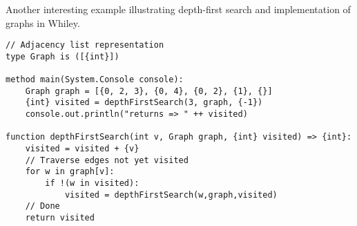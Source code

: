 Another interesting example illustrating depth-first search and implementation of graphs in Whiley.

\begin{lstlisting}
// Adjacency list representation
type Graph is ([{int}])

method main(System.Console console):
    Graph graph = [{0, 2, 3}, {0, 4}, {0, 2}, {1}, {}]
    {int} visited = depthFirstSearch(3, graph, {-1})
    console.out.println("returns => " ++ visited)

function depthFirstSearch(int v, Graph graph, {int} visited) => {int}:
    visited = visited + {v}
    // Traverse edges not yet visited
    for w in graph[v]:
        if !(w in visited):
            visited = depthFirstSearch(w,graph,visited)
    // Done
    return visited
\end{lstlisting}
